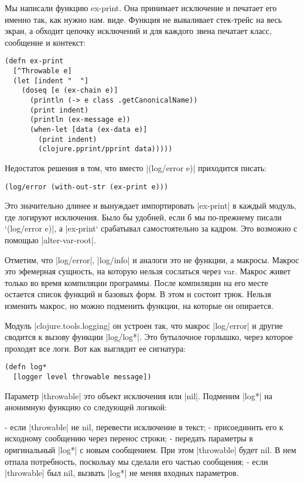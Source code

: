 Мы написали функцию ex-print. Она принимает исключение и печатает его именно
так, как нужно нам. виде. Функция не вываливает стек-трейс на весь экран, а
обходит цепочку исключений и для каждого звена печатает класс, сообщение и
контекст:

\begin{verbatim}
(defn ex-print
  [^Throwable e]
  (let [indent "  "]
    (doseq [e (ex-chain e)]
      (println (-> e class .getCanonicalName))
      (print indent)
      (println (ex-message e))
      (when-let [data (ex-data e)]
        (print indent)
        (clojure.pprint/pprint data)))))
\end{verbatim}

Недостаток решения в том, что вместо \spverb|(log/error e)| приходится писать:

\begin{verbatim}
(log/error (with-out-str (ex-print e)))
\end{verbatim}

Это значительно длинее и вынуждает импортировать \spverb|ex-print| в каждый модуль, где
логируют исключения. Было бы удобней, если б мы по-прежнему писали `(log/error
e)\spverb|, а |ex-print` срабатывал самостоятельно за кадром. Это возможно с помощью
\spverb|alter-var-root|.

Отметим, что \spverb|log/error|, \spverb|log/info| и аналоги это не функции, а макросы. Макрос
это эфемерная сущность, на которую нельзя сослаться через var. Макрос живет
только во время компиляции программы. После компиляции на его месте остается
список функций и базовых форм. В этом и состоит трюк. Нельзя изменить макрос, но
можно подменить функции, на которые он опирается.

Модуль \spverb|clojure.tools.logging| он устроен так, что макрос \spverb|log/error| и другие
сводится к вызову функции \spverb|log/log*|. Это бутылочное горлышко, через которое
проходят все логи. Вот как выглядит ее сигнатура:

\begin{verbatim}
(defn log*
  [logger level throwable message])
\end{verbatim}

Параметр \spverb|throwable| это объект исключения или \spverb|nil|. Подменим \spverb|log*| на
анонимную функцию со следующей логикой:

- если \spverb|throwable| не nil, перевести исключение в текст;
- присоединить его к исходному сообщению через перенос строки;
- передать параметры в оригинальный \spverb|log*| с новым сообщением. При этом
  \spverb|throwable| будет nil. В нем отпала потребность, поскольку мы сделали его
  частью сообщения;
- если \spverb|throwable| был nil, вызвать \spverb|log*| не меняя входных параметров.

